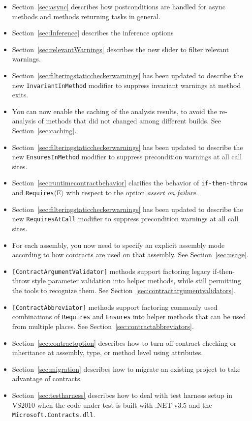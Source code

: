 \documentclass{article}
\newcommand{\code}[1]{\lstinline{#1}}
\newcommand{\requires}[1]{\code{Requires}$\langle$#1$\rangle$}
\begin{document}
\begin{itemize}
\item Section~\ref{sec:async} describes how postconditions are handled for
async methods and methods returning tasks in general.
\item Section~\ref{sec:Inference} describes the inference options 
\item Section~\ref{sec:relevantWarnings} describes the new slider to filter relevant warnings.
\item Section~\ref{sec:filteringstaticcheckerwarnings} has been updated to describe 
the new \code{InvariantInMethod} modifier to suppress  invariant warnings at method exits.
\item You can now enable the caching of the analysis results, to avoid the re-analysis of methods that did not changed among different builds.
See Section~\ref{sec:caching}.
\item   Section~\ref{sec:filteringstaticcheckerwarnings} has been updated to describe 
the new \code{EnsuresInMethod} modifier to suppress  precondition
warnings at all call sites.
\item Section~\ref{sec:runtimecontractbehavior} clarifies the behavior
  of \code{if-then-throw} and \requires{E} with respect to the option
  \emph{assert on failure}. 
\item Section~\ref{sec:filteringstaticcheckerwarnings} has been updated to describe 
the new \code{RequiresAtCall} modifier to suppress  precondition
warnings at all call sites.
\item For each assembly, you now need to specify an explicit assembly
  mode according to how contracts are used on that assembly. See Section~\ref{sec:usage}.
\item \code{[ContractArgumentValidator]} methods support factoring legacy
  if-then-throw style parameter validation into helper methods, while
  still permitting the tools to recognize them. See Section~\ref{sec:contractargumentvalidators}.
\item \code{[ContractAbbreviator]} methods support factoring commonly
  used combinations of \code{Requires} and \code{Ensures} into helper
  methods that can be used from multiple places. See
  Section~\ref{sec:contractabbreviators}.
\item Section~\ref{sec:contractoption} describes how to turn
  off contract checking or inheritance at assembly, type, or method
  level using attributes. 
\item Section~\ref{sec:migration} describes how to migrate an existing
  project to take advantage of contracts.
\item Section~\ref{sec:testharness} describes how to deal with test
  harness setup in VS2010 when the code under test is built with .NET
  v3.5 and the \code{Microsoft.Contracts.dll}.
\end{itemize}
\end{document}
